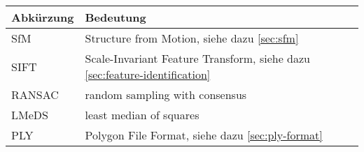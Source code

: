 


\begin{table}[h!]
    \begin{tabularx}{\textwidth}{l X}
        \toprule 
        Abkürzung & Bedeutung \\
        \midrule
        SfM & Structure from Motion, siehe dazu \autoref{sec:sfm} \nameref{sec:sfm}\\
        SIFT & Scale-Invariant Feature Transform, siehe dazu \autoref{sec:feature-identification} \nameref{sec:feature-identification}\\
        RANSAC & random sampling with consensus \\
        LMeDS & least median of squares \\
        PLY & Polygon File Format, siehe dazu \autoref{sec:ply-format} \nameref{sec:ply-format}\\
        \bottomrule 
    \end{tabularx}
\end{table}
